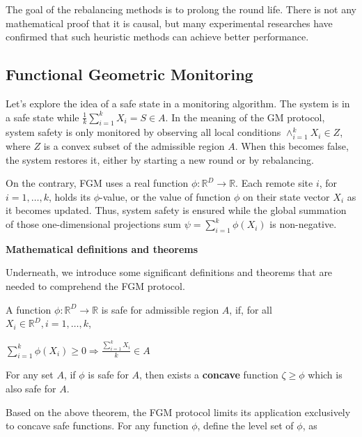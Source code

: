 The goal of the rebalancing methods is to prolong the round life.
There is not any mathematical proof that it is causal, but many experimental researches have confirmed that such heuristic methods can achieve better performance.

\subsection{Functional Geometric Monitoring}\label{subsec:functional-geometric-monitoring}

Let's explore the idea of a safe state in a monitoring algorithm.
The system is in a safe state while $\frac{1}{k} \sum_{i=1}^{k} X_i = S \in A$.
In the meaning of the GM protocol, system safety is only monitored by observing all local conditions $\land_{i=1}^k X_i \in Z$, where $Z$ is a convex subset of the admissible region $A$\@.
When this becomes false, the system restores it, either by starting a new round or by rebalancing.

On the contrary, FGM uses a real function $\phi : \mathbb{R}^D \rightarrow \mathbb{R}$.
Each remote site $i$, for $i = 1, \dots , k$, holds its $\phi$-value, or the value of function $\phi$ on their state vector $X_i$ as it becomes updated.
Thus, system safety is ensured while the global summation of those one-dimensional projections sum $ \psi = \sum_{i=1}^{k} \phi(X_i)$ is non-negative.


{\large \textbf{Mathematical definitions and theorems}}

Underneath, we introduce some significant definitions and theorems that are needed to comprehend the FGM protocol.

\begin{definition}
    A function $\phi : \mathbb{R}^D \rightarrow \mathbb{R}$ is safe for admissible region $A$, if, for all $X_i \in \mathbb{R}^D, i = 1, \dots, k$,
    \begin{center}
        $\sum_{i=1}^{k} \phi(X_i) \geq 0 \Rightarrow \frac{\sum_{i=1}^{k} X_i}{k} \in A$
    \end{center}

\end{definition}

\begin{theorem}
    For any set $A$, if $\phi$ is safe for $A$, then exists a \textbf{concave} function $\zeta \geq \phi$ which is also safe for $A$.
\end{theorem}

Based on the above theorem, the FGM protocol limits its application exclusively to concave safe functions.
For any function $\phi$, define the level set of $\phi$, as

